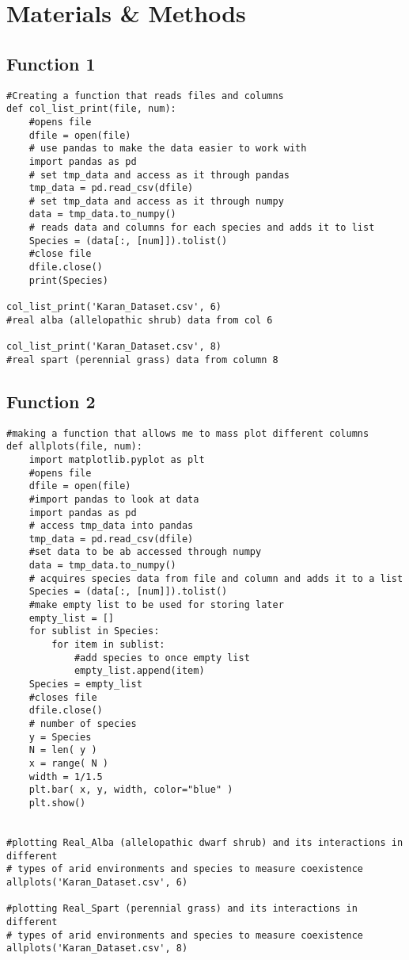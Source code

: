 \documentclass[letterpaper]{article}
\begin{document}
\section{Materials \& Methods}

\subsection{Function 1 }
\begin{verbatim}
#Creating a function that reads files and columns
def col_list_print(file, num):
    #opens file
    dfile = open(file)
    # use pandas to make the data easier to work with
    import pandas as pd
    # set tmp_data and access as it through pandas
    tmp_data = pd.read_csv(dfile)
    # set tmp_data and access as it through numpy
    data = tmp_data.to_numpy()
    # reads data and columns for each species and adds it to list
    Species = (data[:, [num]]).tolist()
    #close file
    dfile.close()
    print(Species)

col_list_print('Karan_Dataset.csv', 6)
#real alba (allelopathic shrub) data from col 6

col_list_print('Karan_Dataset.csv', 8)
#real spart (perennial grass) data from column 8

\end{verbatim}

\subsection{Function 2 }
\begin{verbatim}
#making a function that allows me to mass plot different columns 
def allplots(file, num):
    import matplotlib.pyplot as plt
    #opens file
    dfile = open(file)
    #import pandas to look at data
    import pandas as pd
    # access tmp_data into pandas
    tmp_data = pd.read_csv(dfile)
    #set data to be ab accessed through numpy
    data = tmp_data.to_numpy()
    # acquires species data from file and column and adds it to a list
    Species = (data[:, [num]]).tolist()
    #make empty list to be used for storing later
    empty_list = []
    for sublist in Species:
        for item in sublist:
            #add species to once empty list
            empty_list.append(item)
    Species = empty_list
    #closes file
    dfile.close()
    # number of species
    y = Species
    N = len( y )
    x = range( N )
    width = 1/1.5
    plt.bar( x, y, width, color="blue" )
    plt.show()


#plotting Real_Alba (allelopathic dwarf shrub) and its interactions in different
# types of arid environments and species to measure coexistence
allplots('Karan_Dataset.csv', 6)

#plotting Real_Spart (perennial grass) and its interactions in different
# types of arid environments and species to measure coexistence
allplots('Karan_Dataset.csv', 8)

\end{verbatim}
\end{document}
